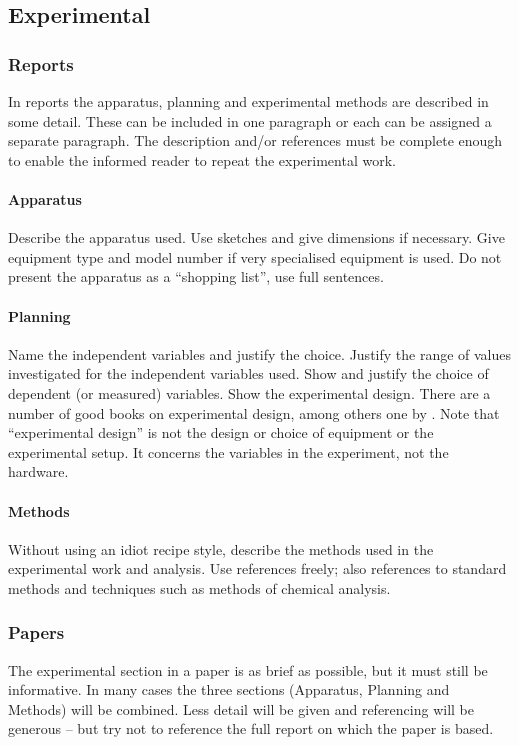 \documentclass[a5paper, 10pt]{article}
\begin{document}
\subsection{Experimental}
\label{sec:experimental}
\subsubsection{Reports}

In reports the apparatus, planning and experimental methods are
described in some detail.  These can be included in one paragraph or
each can be assigned a separate paragraph.  The description and/or
references must be complete enough to enable the informed reader to
repeat the experimental work.

\paragraph{Apparatus} 
Describe the apparatus used.  Use sketches and give dimensions if
necessary.  Give equipment type and model number if very specialised
equipment is used.  Do not present the apparatus as a ``shopping
list'', use full sentences.

\paragraph{Planning}
Name the independent variables and justify the choice.  Justify the
range of values investigated for the independent variables used.  Show
and justify the choice of dependent (or measured) variables.  Show the
experimental design.  There are a number of good books on experimental
design, among others one by \citet{hicks}.  Note that
``experimental design'' is not the design or choice of equipment or
the experimental setup.  It concerns the variables in the experiment,
not the hardware.

\paragraph{Methods}
Without using an idiot recipe style, describe the methods used in the
experimental work and analysis.  Use references freely; also
references to standard methods and techniques such as methods of
chemical analysis.

\subsubsection{Papers}
The experimental section in a paper is as brief as possible, but it
must still be informative.  In many cases the three sections
(Apparatus, Planning and Methods) will be combined.  Less detail will
be given and referencing will be generous -- but try not to reference
the full report on which the paper is based.
\end{document}
